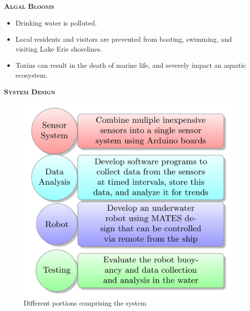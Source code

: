 \documentclass[final,t]{beamer}
\begin{document}
\begin{frame}{}
\begin{columns}
\begin{column}{.33\linewidth}
\begin{block}{\textsc{\textbf{Algal Blooms}}}
                \begin{itemize}
               		\item Drinking water is polluted.
					\item Local residents and visitors are prevented from boating, swimming,
          and visiting Lake Erie shorelines.
					\item Toxins can result in the death of marine life, and severely impact
          an aquatic ecosystem.
				\end{itemize}
                    \vspace*{3mm}
                \end{block}
                \begin{alertblock}{\textsc{\textbf{System Design}}}
					   \begin{figure}
                    		\includegraphics[scale = 3.5]{assets/diagram.jpg}
                    	\caption{Different portions comprising the system}
                    	\end{figure}
                \end{alertblock}


\end{column}
\end{columns}
\end{frame}
\end{document}
